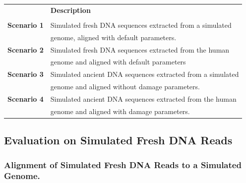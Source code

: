 \documentclass[11pt,a4paper]{report}
\begin{document}
\begin{table}[H]
  \begin{tabular}{ | c| l |}
    \hline
 		                           &  \textbf{Description} \\\\ \hline
       \textbf{  Scenario 1 }  &  Simulated fresh DNA sequences extracted from a simulated \\
                               &  genome, aligned with default parameters. \\ \hline
       \textbf{  Scenario 2 }  &  Simulated fresh DNA sequences extracted from the human \\
                               &  genome and aligned with default parameters \\  \hline
       \textbf{  Scenario 3 }  &  Simulated ancient DNA sequences extracted from a simulated \\
                               &  genome and aligned without damage parameters. \\  \hline
       \textbf{  Scenario 4 }  &  Simulated ancient DNA sequences extracted from the human \\
                               &   genome and aligned with damage parameters. \\  \hline
       
    \end{tabular}
\label{test-scenarios}
\end{table}




\subsection{Evaluation on Simulated Fresh DNA Reads } \label{Simulated Fresh DNA Reads }
 
 \subsubsection {Alignment of Simulated Fresh DNA Reads to a Simulated Genome.}
 \label {Alignment of Simulated Fresh DNA Reads to a Simulated Genome.}
 
\end{document}
